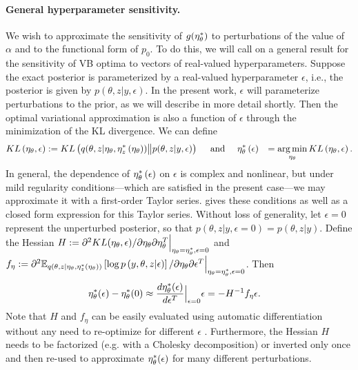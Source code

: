 
\paragraph{General hyperparameter sensitivity.}
%
We wish to approximate the sensitivity of $g(\eta_\theta^{*})$ to perturbations of the
value of $\alpha$ and to the functional form of $p_{0}$.  To do this, we will
call on a general result for the sensitivity of VB optima to vectors of
real-valued hyperparameters.  Suppose the exact posterior is parameterized by a
real-valued hyperparameter $\epsilon$, i.e., the posterior is given by
$p\left(\theta, z \vert y, \epsilon\right)$. In the present work, $\epsilon$
will parameterize perturbations to the prior, as we will describe in more detail
shortly.  Then the optimal variational approximation is also a function of
$\epsilon$ through the minimization of the KL divergence.  We can define
%
\begin{align}
KL\left(\eta_\theta, \epsilon\right) &:=
    KL\left(q(\theta, z \vert \eta_\theta, \etazopt\left(\eta_\theta\right))
    \big\| p(\theta, z | y, \epsilon) \right) %
\quad\textrm{ and }\quad
\etathetaopt\left(\epsilon\right) &=
    \argmin_{\eta_\theta} KL\left(\eta_\theta, \epsilon\right).
    \label{eq:pert_kl_objective}
\end{align}
%
In general, the dependence of $\eta_\theta^{*}\left(\epsilon\right)$ on $\epsilon$
is complex and nonlinear, but under mild regularity conditions---which are
satisfied in the present case---we may approximate it with a first-order Taylor
series. \citet[Theorem 2]{giordano:2017:covariances} gives these conditions as
well as  a closed form expression for this Taylor series. Without loss of
generality, let $\epsilon=0$ represent the unperturbed posterior, so that
$p\left(\theta, z \vert y, \epsilon=0\right) = p\left(\theta, z \vert y
\right)$.
%
Define the Hessian
$H := \partial^2 KL(\eta_\theta, \epsilon) /
    \partial \eta_\theta \partial \eta_\theta^T
    \Big\rvert_{\eta_\theta = \eta_\theta^{*}, \epsilon = 0}$ and
$f_\eta := \partial^2
    \mathbb{E}_{q\left(\theta, z \vert \eta_\theta, \eta_z^{*}(\eta_\theta)\right)} \left[ \log p\left(y, \theta, z \vert \epsilon \right) \right]
    / \partial \eta_\theta \partial \epsilon^T
    \Big\rvert_{\eta_\theta = \eta_\theta^{*}, \epsilon = 0}$.
Then
%
\begin{align}
\eta_\theta^{*}(\epsilon)  -  \eta_\theta^{*}(0) &\approx
\frac{d \eta_\theta^{*}(\epsilon)}{d\epsilon^T}\Big|_{\epsilon=0} \epsilon =
- H^{-1} f_\eta \epsilon.
\label{eq:our_approximation}
\end{align}
%
Note that $H$ and $f_\eta$ can be easily evaluated using automatic
differentiation without any need to re-optimize for different $\epsilon$
\citep{maclaurin:2015:autograd}.  Furthermore,
the Hessian $H$ needs to be factorized (e.g. with a Cholesky decomposition) or
inverted only once and then re-used to approximate $\eta_\theta^{*}(\epsilon)$ for
many different perturbations.

